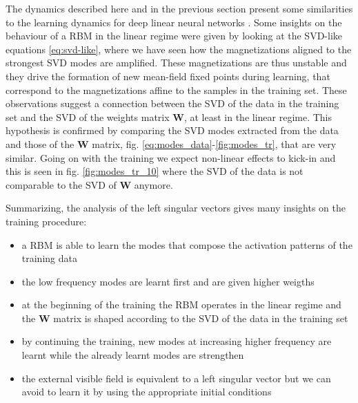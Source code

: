 \documentclass{revtex4-1}
\begin{document}
The dynamics described here and in the previous section present some similarities to the learning dynamics for deep linear neural networks \cite{ganguli}. Some insights on the behaviour of a RBM in the linear regime were given by looking at the SVD-like equations \eqref{eq:svd-like}, where we have seen how the magnetizations aligned to the strongest SVD modes are amplified. These magnetizations are thus unstable and they drive the formation of new mean-field fixed points during learning, that correspond to the magnetizations affine to the samples in the training set. These observations suggest a connection between the SVD of the data in the training set and the SVD of the weights matrix \(\mathbf{W}\), at least in the linear regime. This hypothesis is confirmed by comparing the SVD modes extracted from the data and those of the \(\mathbf{W}\) matrix, fig. \ref{eq:modes_data}-\ref{fig:modes_tr}, that are very similar. Going on with the training we expect non-linear effects to kick-in and this is seen in fig. \ref{fig:modes_tr_10} where the SVD of the data is not comparable to the SVD of \(\mathbf{W}\) anymore.

Summarizing, the analysis of the left singular vectors gives many insights on the training procedure:

\begin{itemize}
\item a RBM is able to learn the modes that compose the activation patterns of the training data
\item the low frequency modes are learnt first and are given higher weigths
\item at the beginning of the training the RBM operates in the linear regime and the \(\mathbf{W}\) matrix is shaped according to the SVD of the data in the training set
\item by continuing the training, new modes at increasing higher frequency are learnt while the already learnt modes are strengthen
\item the external visible field is equivalent to a left singular vector but we can avoid to learn it by using the appropriate initial conditions
\end{itemize}
\end{document}
